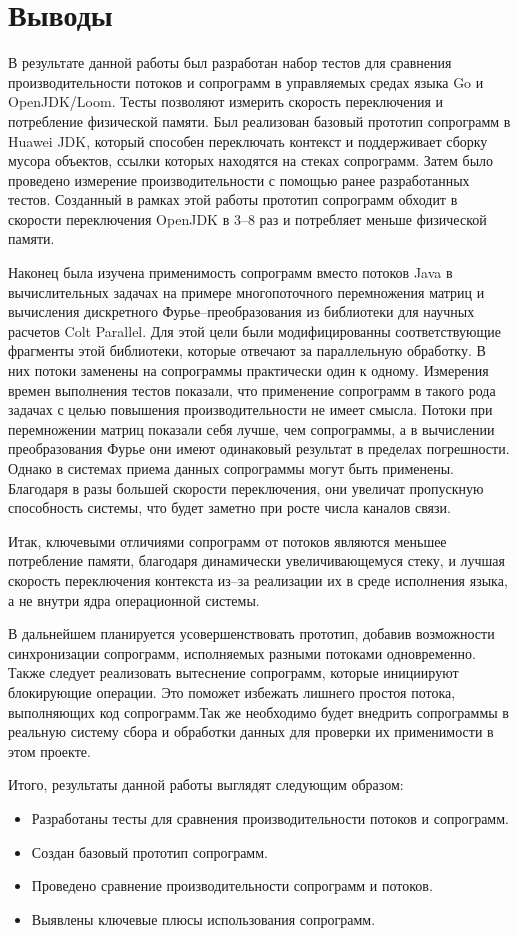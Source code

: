 \section{Выводы}
	В результате данной работы был разработан набор тестов для сравнения производительности потоков и сопрограмм в
	управляемых средах языка Go и OpenJDK/Loom. Тесты позволяют измерить скорость переключения и
	потребление физической памяти. Был реализован базовый прототип сопрограмм в
	Huawei JDK, который способен переключать контекст и поддерживает сборку мусора объектов, ссылки которых находятся
	на стеках сопрограмм. Затем было проведено измерение производительности с помощью ранее разработанных тестов.
	Созданный в рамках этой работы прототип сопрограмм обходит в скорости переключения
	OpenJDK в 3--8 раз и потребляет меньше физической памяти.
	\par
	Наконец была изучена применимость сопрограмм вместо потоков Java в вычислительных задачах на
	примере многопоточного перемножения матриц и вычисления дискретного Фурье--преобразования 
	из библиотеки для научных расчетов Colt Parallel. Для этой цели были модифицированны соответствующие 
	фрагменты этой библиотеки, которые отвечают за параллельную обработку. В них потоки заменены 
	на сопрограммы практически один к одному.
	Измерения времен выполнения тестов показали, что применение сопрограмм в такого рода задачах с целью
	повышения производительности не имеет смысла. Потоки при перемножении матриц показали себя лучше,
	чем сопрограммы, а в вычислении преобразования Фурье они имеют одинаковый результат в пределах погрешности.
	Однако в системах приема данных сопрограммы могут быть применены. Благодаря в разы большей скорости
	переключения, они увеличат пропускную способность системы, что будет заметно при росте числа каналов связи.
	\par
	Итак, ключевыми отличиями сопрограмм от потоков являются меньшее потребление памяти, благодаря
	динамически увеличивающемуся стеку, и лучшая скорость 
	переключения контекста из--за реализации их в среде исполнения языка, а не внутри ядра операционной системы.
	\par
	В дальнейшем планируется усовершенствовать прототип, добавив возможности синхронизации
	сопрограмм, исполняемых разными потоками одновременно. Также следует реализовать вытеснение сопрограмм, которые
	инициируют блокирующие операции. Это поможет избежать лишнего простоя потока, выполняющих код сопрограмм.Так же
	необходимо будет внедрить сопрограммы в реальную систему сбора и обработки данных для проверки их 
	применимости в этом проекте.
	\par
	Итого, результаты данной работы выглядят следующим образом:
	\begin{itemize}
		\item Разработаны тесты для сравнения производительности потоков и сопрограмм.
		\item Создан базовый прототип сопрограмм.
		\item Проведено сравнение производительности сопрограмм и потоков.
		\item Выявлены ключевые плюсы использования сопрограмм.
	\end{itemize}
\clearpage
